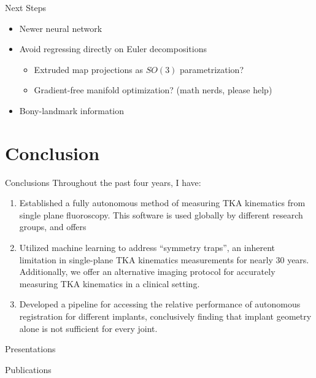 \documentclass[presentation, aspectratio=1610]{beamer}
\begin{document}
\begin{frame}[label={sec:org1d6b301}]{Next Steps}
\begin{itemize}
\item Newer neural network
\item Avoid regressing directly on Euler decompositions
\begin{itemize}
\item Extruded map projections as \(SO(3)\) parametrization?
\item Gradient-free manifold optimization? (math nerds, please help)
\end{itemize}
\item Bony-landmark information
\end{itemize}
\end{frame}
\section{Conclusion}
\label{sec:org5edd4dd}
\begin{frame}[label={sec:org27eb6a2}]{Conclusions}
Throughout the past four years, I have:
\begin{enumerate}
\item Established a fully autonomous method of measuring TKA kinematics from single plane fluoroscopy. This software is used globally by different research groups, and offers
\item Utilized machine learning to address ``symmetry traps'', an inherent limitation in single-plane TKA kinematics measurements for nearly 30 years. Additionally, we offer an alternative imaging protocol for accurately measuring TKA kinematics in a clinical setting.
\item Developed a pipeline for accessing the relative performance of autonomous registration for different implants, conclusively finding that implant geometry alone is not sufficient for every joint.
\end{enumerate}
\end{frame}
\begin{frame}[label={sec:orgfb66746},fragile, allowframebreaks, label=]{Presentations}
\begin{refsection}
  \newrefcontext[sorting=ynt]
  
  \printbibliography[title=Presentations]
\end{refsection}
\end{frame}
\begin{frame}[label={sec:org2e006a1},fragile, allowframebreaks, label=]{Publications}
\begin{refsection}
	\newrefcontext[sorting=ynt]
	
	\printbibliography[title=Publications]
\end{refsection}
\end{frame}
\end{document}
